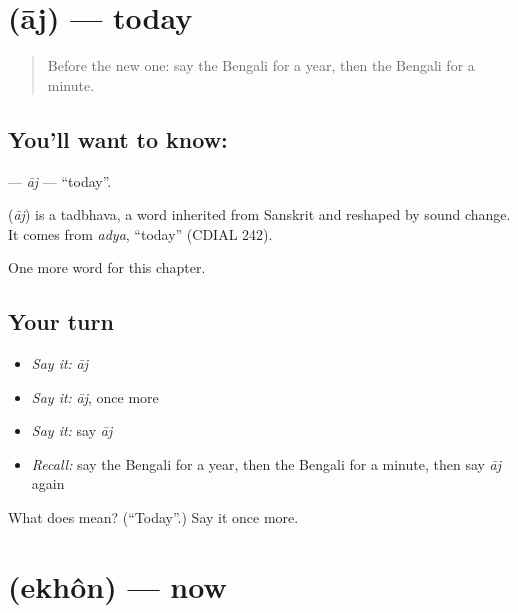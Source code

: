\section[\texorpdfstring{\bn{আজ} (āj)}{আজ (āj)}]{ (āj) — today}

\label{lesson:BN-C79-aj}



\begin{quote}
Before the new one: say the Bengali for a year, then the Bengali for a minute.
\end{quote}

\subsection*{You'll want to know: }
\textbf{} — \emph{āj} — \textquotedblleft{}today\textquotedblright{}.

\begin{cousinweb}
\textbf{} (\emph{āj}) is a tadbhava, a word inherited from Sanskrit and reshaped by sound change. It comes from \emph{adya}, \textquotedblleft{}today\textquotedblright{} (CDIAL 242).
\end{cousinweb}

\begin{grammarlens}[title={What you've built}]
One more word for this chapter.
\end{grammarlens}

\subsection*{Your turn}
\begin{itemize}
\raggedright
  \item \emph{Say it:} \emph{āj}
  \item \emph{Say it:} \emph{āj}, once more
  \item \emph{Say it:} say \emph{āj}
  \item \emph{Recall:} say the Bengali for a year, then the Bengali for a minute, then say \emph{āj} again
\end{itemize}

\begin{tcolorbox}[breakable,colback=teal!4,colframe=teal!35!black,title={Before you move on}]
What does  mean? (\textquotedblleft{}Today\textquotedblright{}.) Say it once more.
\end{tcolorbox}
\section[\texorpdfstring{\bn{এখন} (ekhôn)}{এখন (ekhôn)}]{ (ekhôn) — now}


